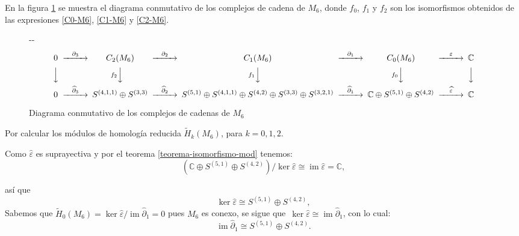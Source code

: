 \documentclass[12pt]{book}
\newlength{\offsetpage}
\newenvironment{widepage}{\begin{adjustwidth}{-\offsetpage}{-\offsetpage}%
    \addtolength{\textwidth}{2\offsetpage}}%
{\end{adjustwidth}}
\theoremstyle{definition}
\DeclareMathOperator{\im}{im}
\newcounter{in}
\begin{document}
  En la figura \ref{fig:diagrama-conmutativo6} se muestra el diagrama
  conmutativo de los complejos de cadena de $M_{6}$, donde $f_{0}$,
  $f_{1}$ y $f_{2}$ son los isomorfismos obtenidos de las expresiones
  \ref{C0-M6}, \ref{C1-M6} y \ref{C2-M6}.

  \begin{figure}[h]
    \centering
    \begin{widepage}
      \scriptsize{
        \[
        \begin{CD}
          0 @>{\partial_{3}}>> C_{2}(M_{6}) @>{\partial_{2}}>> C_{1}(M_{6}) @>{\partial_{1}}>> C_{0}(M_{6}) @>{\varepsilon}>> \mathbb{C}\\
          @VVV @Vf_{2}VV   @Vf_{1}VV  @Vf_{0}VV  @VVV    \\
          0 @>{\widehat\partial_{3}}>> S^{(4,1,1)}\oplus S^{(3,3)}
          @>{\widehat\partial_{2}}>> S^{(5,1)}\oplus S^{(4,1,1)}\oplus
          S^{(4,2)}\oplus S^{(3,3)}\oplus S^{(3,2,1)}
          @>{\widehat\partial_{1}}>> \mathbb{C} \oplus S^{(5,1)}\oplus
          S^{(4,2)} @>{\widehat \varepsilon}>> \mathbb{C}
        \end{CD}
        \]
      }
    \end{widepage}
\caption{Diagrama conmutativo de los complejos de cadenas de $M_{6}$}
\label{fig:diagrama-conmutativo6}
\end{figure}

Por calcular los módulos de homología reducida $\widetilde
H_{k}(M_{6})$, para $k=0,1,2$.

Como $\widehat\varepsilon$ es suprayectiva y por el teorema \ref{teorema-isomorfismo-mod} tenemos:
\begin{equation*}
  (\mathbb{C} \oplus S^{(5,1)}\oplus S^{(4,2)})/\ker\widehat\varepsilon\cong \im \widehat\varepsilon=\mathbb{C},
\end{equation*}

así que
\begin{equation*}
  \label{ker0-M6}
  \ker\widehat\varepsilon\cong  S^{(5,1)}\oplus S^{(4,2)}, 
\end{equation*}
Sabemos que $\widetilde H_{0}(M_{6})=\ker \widehat\varepsilon/\im
\widehat\partial_{1}=0$ pues $M_{6}$ es conexo, se sigue que~$\ker \widehat\varepsilon\cong
\im\widehat\partial_{1}$, con lo cual:
\begin{equation}
  \label{im1-M6}
  \im \widehat\partial_{1}\cong  S^{(5,1)}\oplus S^{(4,2)}. 
\end{equation}
\end{document}
